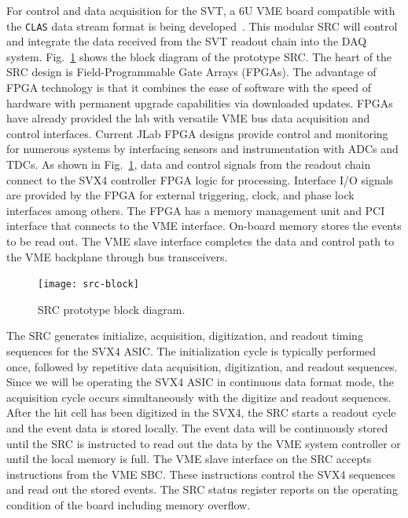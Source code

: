 For control and data acquisition for the SVT, a 6U VME board compatible 
with the {\tt CLAS} data stream format is being developed~\cite{CN2004-04}.
This modular SRC will control and integrate the data received from the SVT 
readout chain into the DAQ system.  Fig.~\ref{fig:src-block} shows the block 
diagram of the prototype SRC.  The heart of the SRC design is 
Field-Programmable Gate Arrays (FPGAs).  The advantage of FPGA technology 
is that it combines the ease of software with the speed of hardware with 
permanent upgrade capabilities via downloaded updates.  FPGAs have already 
provided the lab with versatile VME bus data acquisition and control 
interfaces.  Current JLab FPGA designs provide control and monitoring for 
numerous systems by interfacing sensors and instrumentation with ADCs and
TDCs.  As shown in Fig.~\ref{fig:src-block}, data and control signals from 
the readout chain connect to the SVX4 controller FPGA logic for processing.  
Interface I/O signals are provided by the FPGA for external triggering, 
clock, and phase lock interfaces among others.  The FPGA has a memory 
management unit and PCI interface that connects to the VME interface.  
On-board memory stores the events to be read out.  The VME slave interface 
completes the data and control path to the VME backplane through bus 
transceivers.

\begin{figure}[htbp]
\centering
\texttt{[image: src-block]}
\caption{\small{SRC prototype block diagram.}}
\label{fig:src-block}
\end{figure}

The SRC generates initialize, acquisition, digitization, and readout 
timing sequences for the SVX4 ASIC.  The initialization cycle is typically 
performed once, followed by repetitive data acquisition, digitization, and 
readout sequences.  Since we will be operating the SVX4 ASIC in 
continuous data format mode, the acquisition cycle occurs simultaneously 
with the digitize and readout sequences.  After the hit cell has been 
digitized in the SVX4, the SRC starts a readout cycle and the event data 
is stored locally.  The event data will be continuously stored until the 
SRC is instructed to read out the data by the VME system controller or 
until the local memory is full.  The VME slave interface on the SRC accepts 
instructions from the VME SBC.  These instructions control the SVX4 
sequences and read out the stored events.  The SRC status register reports 
on the operating condition of the board including memory overflow.


